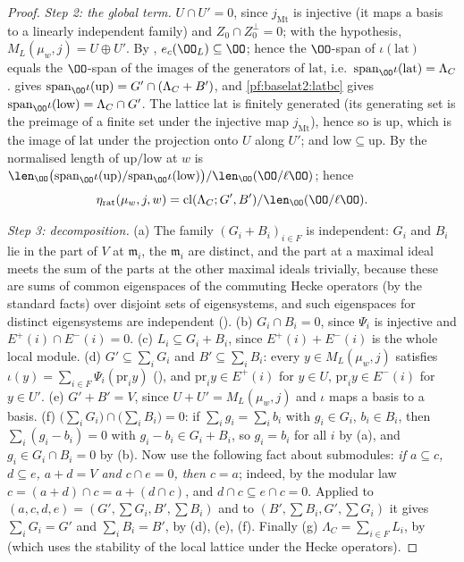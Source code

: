 \begin{proof}
\emph{Step 2: the global term.} $U\cap U'=0$, since $j_{\mathrm{Mt}}$ is injective (it maps a basis to a linearly
independent family) and $Z_0\cap Z_0^\perp=0$; with the hypothesis, $M_L(\mu_w,j)=U\oplus U'$. By
, $e_c(\OO_L)\subseteq\OO$; hence the $\OO$-span of
$\iota(\mathrm{lat})$ equals the $\OO$-span of the images of the generators of $\mathrm{lat}$, i.e.\ $\mathrm{span}_\OO\iota(\mathrm{lat})=\Lambda_C$.
 gives
$\mathrm{span}_\OO\iota(\mathrm{up})=G'\cap(\Lambda_C+B')$, and \cref{pf:baselat2:latbc} gives $\mathrm{span}_\OO\iota(\mathrm{low})=\Lambda_C\cap G'$.
The lattice $\mathrm{lat}$ is finitely generated (its generating set is the preimage of a finite set under the
injective map $j_{\mathrm{Mt}}$), hence so is $\mathrm{up}$, which is the image of $\mathrm{lat}$ under the projection onto $U$ along
$U'$; and $\mathrm{low}\subseteq\mathrm{up}$. By  the
normalised length of $\mathrm{up}/\mathrm{low}$ at $w$ is
$\len_\OO\bigl(\mathrm{span}_\OO\iota(\mathrm{up})/\mathrm{span}_\OO\iota(\mathrm{low})\bigr)/\len_\OO(\OO/\ell\OO)$; hence
\[
  \eta_{\mathrm{rat}}(\mu_w,j,w)=\mathrm{cl}(\Lambda_C;G',B')/\len_\OO(\OO/\ell\OO).
\]

\emph{Step 3: decomposition.} (a) The family $(G_i+B_i)_{i\in F}$ is independent: $G_i$ and $B_i$ lie in the part of
$V$ at $\mathfrak m_i$, the $\mathfrak m_i$ are distinct, and the part at a maximal ideal meets the sum of the parts at the other
maximal ideals trivially, because these are sums of common eigenspaces of the commuting Hecke operators (by the
standard facts) over disjoint sets of eigensystems, and such eigenspaces for distinct eigensystems are
independent ().
(b) $G_i\cap B_i=0$, since $\Psi_i$ is injective and $E^+(i)\cap E^-(i)=0$. (c) $L_i\subseteq G_i+B_i$, since
$E^+(i)+E^-(i)$ is the whole local module. (d) $G'\subseteq\sum_iG_i$ and $B'\subseteq\sum_iB_i$: every $y\in M_L(\mu_w,j)$ satisfies
$\iota(y)=\sum_{i\in F}\Psi_i(\mathrm{pr}_iy)$ (),
and $\mathrm{pr}_iy\in E^+(i)$ for $y\in U$, $\mathrm{pr}_iy\in E^-(i)$ for $y\in U'$. (e) $G'+B'=V$, since $U+U'=M_L(\mu_w,j)$ and
$\iota$ maps a basis to a basis. (f) $\bigl(\sum_iG_i\bigr)\cap\bigl(\sum_iB_i\bigr)=0$: if $\sum_ig_i=\sum_ib_i$ with $g_i\in G_i$,
$b_i\in B_i$, then $\sum_i(g_i-b_i)=0$ with $g_i-b_i\in G_i+B_i$, so $g_i=b_i$ for all $i$ by (a), and $g_i\in G_i\cap B_i=0$ by
(b). Now use the following fact about submodules:
\emph{if $a\subseteq c$, $d\subseteq e$, $a+d=V$ and $c\cap e=0$, then $c=a$}; indeed, by the modular law
$c=(a+d)\cap c=a+(d\cap c)$, and $d\cap c\subseteq e\cap c=0$. Applied to $(a,c,d,e)=(G',\sum G_i,B',\sum B_i)$ and to
$(B',\sum B_i,G',\sum G_i)$ it gives $\sum_iG_i=G'$ and $\sum_iB_i=B'$, by (d), (e), (f). Finally (g)
$\Lambda_C=\sum_{i\in F}L_i$, by  (which uses the
stability of the local lattice under the Hecke operators).


\end{proof}
